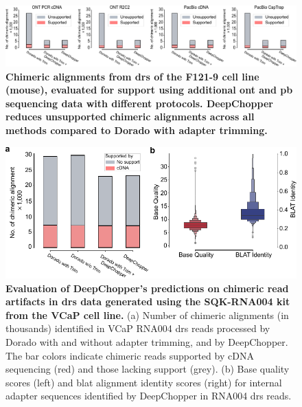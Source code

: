 \documentclass[pdflatex,sn-nature, lineno]{sn-jnl}%
\begin{document}
\begin{figure}[!ht]
    \includegraphics[height=0.\columnwidth]{finals/sf2}
    \caption{ {\bf Chimeric alignments from \gls{drs} of the F121-9 cell line (mouse), evaluated for support using additional \gls{ont} and \gls{pb} sequencing data with different protocols. DeepChopper reduces unsupported chimeric alignments across all methods compared to Dorado with adapter trimming.}}\label{fig:sf2}
\end{figure}




\begin{figure}[!ht]
    \includegraphics[height=0.41\columnwidth]{finals/sf3}
    \caption{ {\bf Evaluation of DeepChopper's predictions on chimeric read artifacts in \gls{drs} data generated using the SQK-RNA004 kit from the VCaP cell line.} (a) Number of chimeric alignments (in thousands) identified in VCaP RNA004 \gls{drs} reads processed by Dorado with and without adapter trimming, and by DeepChopper. The bar colors indicate chimeric reads supported by cDNA sequencing (red) and those lacking support (grey). (b) Base quality scores (left) and \gls{blat} alignment identity scores (right) for internal adapter sequences identified by DeepChopper in RNA004 \gls{drs} reads.}\label{fig:sf3}
\end{figure}
\end{document}
